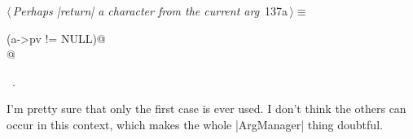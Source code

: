 \documentclass[a4paper]{report}
\begin{document}
\begin{flushleft} \small
\begin{minipage}{\linewidth}\label{scrap297}\raggedright\small
{} $\langle\,${\it Perhaps |return| a character from the current arg}\nobreak\ {\footnotesize {137a}}$\,\rangle\equiv$
\vspace{-1ex}
\begin{list}{}{} \item
\mbox{}\verb@if (a->pv != NULL)@\\
\mbox{}@\\
\mbox{}\verb@@{\NWsep}
\end{list}
\vspace{-1.5ex}
\footnotesize
\begin{list}{}{\setlength{\itemsep}{-\parsep}\setlength{\itemindent}{-\leftmargin}}
\item \NWtxtMacroRefIn\ .

\item{}
\end{list}
\end{minipage}\vspace{4ex}
\end{flushleft}
I'm pretty sure that only the first case is ever used. I don't think
the others can occur in this context, which makes the whole
|ArgManager| thing doubtful.
\end{document}
